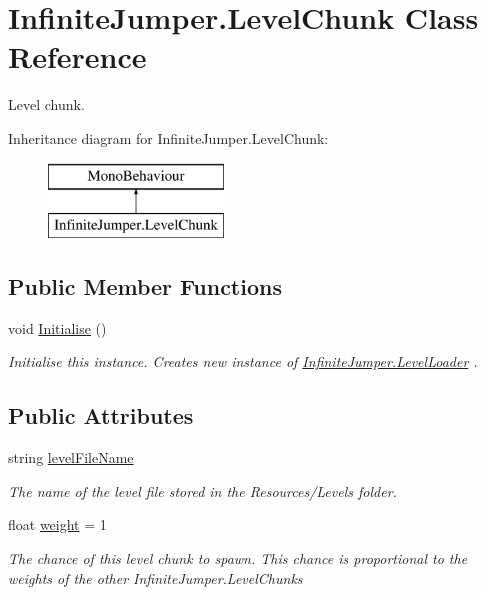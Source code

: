 \hypertarget{class_infinite_jumper_1_1_level_chunk}{}\section{Infinite\+Jumper.\+Level\+Chunk Class Reference}
\label{class_infinite_jumper_1_1_level_chunk}


Level chunk.  


Inheritance diagram for Infinite\+Jumper.\+Level\+Chunk\+:\begin{figure}[H]
\begin{center}
\leavevmode
\includegraphics[height=2.000000cm]{class_infinite_jumper_1_1_level_chunk}
\end{center}
\end{figure}
\subsection*{Public Member Functions}
\begin{DoxyCompactItemize}
\item 
void \hyperlink{class_infinite_jumper_1_1_level_chunk_a53e29a604e7e57f8d048600b14978a41}{Initialise} ()
\begin{DoxyCompactList}\small\item\em Initialise this instance. Creates new instance of \hyperlink{class_infinite_jumper_1_1_level_loader}{Infinite\+Jumper.\+Level\+Loader} . \end{DoxyCompactList}\end{DoxyCompactItemize}
\subsection*{Public Attributes}
\begin{DoxyCompactItemize}
\item 
string \hyperlink{class_infinite_jumper_1_1_level_chunk_ac104267a54d24e3385ad7c4bde2e3f58}{level\+File\+Name}
\begin{DoxyCompactList}\small\item\em The name of the level file stored in the Resources/\+Levels folder. \end{DoxyCompactList}\item 
float \hyperlink{class_infinite_jumper_1_1_level_chunk_ad0f0414835c2a34aeefe18df62527a55}{weight} = 1
\begin{DoxyCompactList}\small\item\em The chance of this level chunk to spawn. This chance is proportional to the weights of the other Infinite\+Jumper.\+Level\+Chunks \end{DoxyCompactList}\end{DoxyCompactItemize}
